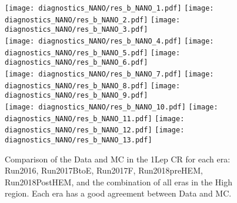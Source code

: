 \begin{figure}[!htb]
	\begin{center}  
  \texttt{[image: diagnostics\_NANO/res\_b\_NANO\_1.pdf]}
  \texttt{[image: diagnostics\_NANO/res\_b\_NANO\_2.pdf]} 
  \texttt{[image: diagnostics\_NANO/res\_b\_NANO\_3.pdf]} \\
  \texttt{[image: diagnostics\_NANO/res\_b\_NANO\_4.pdf]}
  \texttt{[image: diagnostics\_NANO/res\_b\_NANO\_5.pdf]} 
  \texttt{[image: diagnostics\_NANO/res\_b\_NANO\_6.pdf]} \\
  \texttt{[image: diagnostics\_NANO/res\_b\_NANO\_7.pdf]}
  \texttt{[image: diagnostics\_NANO/res\_b\_NANO\_8.pdf]} 
  \texttt{[image: diagnostics\_NANO/res\_b\_NANO\_9.pdf]} \\
  \texttt{[image: diagnostics\_NANO/res\_b\_NANO\_10.pdf]}
  \texttt{[image: diagnostics\_NANO/res\_b\_NANO\_11.pdf]} 
  \texttt{[image: diagnostics\_NANO/res\_b\_NANO\_12.pdf]}     
  \texttt{[image: diagnostics\_NANO/res\_b\_NANO\_13.pdf]} \\ 
	\end{center}
	\caption[B Jet Response]{Comparison of the Data and MC in the 1Lep CR for each era: Run2016, Run2017BtoE, Run2017F, Run2018preHEM, Run2018PostHEM, and the combination of all eras in the High \dm{} region. Each era has a good agreement between Data and MC. 
	 }
	\label{fig:qcd-1lcr-datavsmc-hm-inclusive}
\end{figure}
